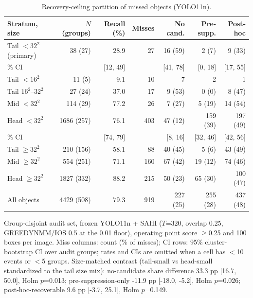 \begin{table}[!htbp]
\centering
\footnotesize
\caption{Recovery-ceiling partition of missed objects (YOLO11n).}
\label{tab:partition}
\begin{tabular}{lrrrrrr}
\toprule
Stratum, size & $N$ (groups) & Recall (\%) & Misses & No cand. & Pre-supp. & Post-hoc \\
\midrule
Tail $<32^2$ (primary) & 38 (27) & 28.9 & 27 & 16 (59) & 2 (7) & 9 (33) \\
\quad 95\% CI & & [12, 49] & & [41, 78] & [0, 18] & [17, 55] \\
\quad Tail $<16^2$ & 11 (5) & 9.1 & 10 & 7 & 2 & 1 \\
\quad Tail $16^2$--$32^2$ & 27 (24) & 37.0 & 17 & 9 (53) & 0 (0) & 8 (47) \\
Mid $<32^2$ & 114 (29) & 77.2 & 26 & 7 (27) & 5 (19) & 14 (54) \\
Head $<32^2$ & 1686 (257) & 76.1 & 403 & 47 (12) & 159 (39) & 197 (49) \\
\quad 95\% CI & & [74, 79] & & [8, 16] & [32, 46] & [42, 56] \\
Tail $\geq 32^2$ & 210 (156) & 58.1 & 88 & 40 (45) & 5 (6) & 43 (49) \\
Mid $\geq 32^2$ & 554 (251) & 71.1 & 160 & 67 (42) & 19 (12) & 74 (46) \\
Head $\geq 32^2$ & 1827 (332) & 88.2 & 215 & 50 (23) & 65 (30) & 100 (47) \\
All objects & 4429 (508) & 79.3 & 919 & 227 (25) & 255 (28) & 437 (48) \\
\bottomrule
\end{tabular}
\par\smallskip\parbox{0.95\linewidth}{\footnotesize Group-disjoint audit set, frozen YOLO11n + SAHI ($T$=320, overlap 0.25, GREEDYNMM/IOS 0.5 at the 0.01 floor), operating point score $\geq$0.25 and 100 boxes per image. Miss columns: count (\% of misses); CI rows: 95\% cluster-bootstrap CI over audit groups; rates and CIs are omitted when a cell has $<$10 events or $<$5 groups. Size-matched contrast (tail-small vs head-small standardized to the tail size mix): no-candidate share difference 33.3 pp [16.7, 50.0], Holm $p$=0.013; pre-suppression-only -11.9 pp [-18.0, -5.2], Holm $p$=0.026; post-hoc-recoverable 9.6 pp [-3.7, 25.1], Holm $p$=0.149.}
\end{table}
